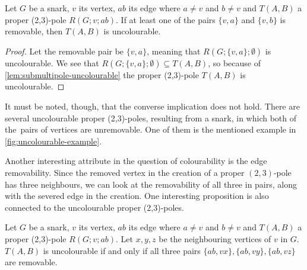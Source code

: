 \begin{proposition}
	Let $G$ be a snark, $v$ its vertex, $ab$ its edge where $a\neq v$ and $b \neq v$ and $T(A,B)$ a proper (2,3)-pole $R(G;v;ab)$. If at least one of the pairs $\{v,a\}$ and $\{v,b\}$ is removable, then $T(A,B)$ is uncolourable.
	\label{prop:uncolourable-vertices}
\end{proposition}

\begin{proof}
	Let the removable pair be $\{v,a\}$, meaning that $R(G;\{v,a\};\emptyset)$ is uncolourable. We see that $R(G;\{v,a\};\emptyset)\subseteq T(A,B)$, so because of \cref{lem:submultipole-uncolourable} the proper (2,3)-pole $T(A,B)$ is uncolourable.
\end{proof}

It must be noted, though, that the converse implication does not hold. There are several uncolourable proper (2,3)-poles, resulting from a snark, in which both of the~pairs of vertices are unremovable. One of them is the mentioned example in \cref{fig:uncolourable-example}.

Another interesting attribute in the question of colourability is the edge removability. Since the removed vertex in the creation of a proper $(2,3)$-pole has three neighbours, we can look at the removability of all three in pairs, along with the severed edge in the creation. One interesting proposition is also connected to the uncolourable proper (2,3)-poles.

\begin{proposition}
	Let $G$ be a snark, $v$ its vertex, $ab$ its edge where $a\neq v$ and $b \neq v$ and $T(A,B)$ a proper (2,3)-pole $R(G;v;ab)$. Let $x,y,z$ be the neighbouring vertices of $v$ in $G$. $T(A,B)$ is uncolourable if and only if all three pairs $\{ab,vx\}, \{ab,vy\}, \{ab,vz\}$ are removable.
	\label{prop:uncolourable-all-pairs}
\end{proposition}

